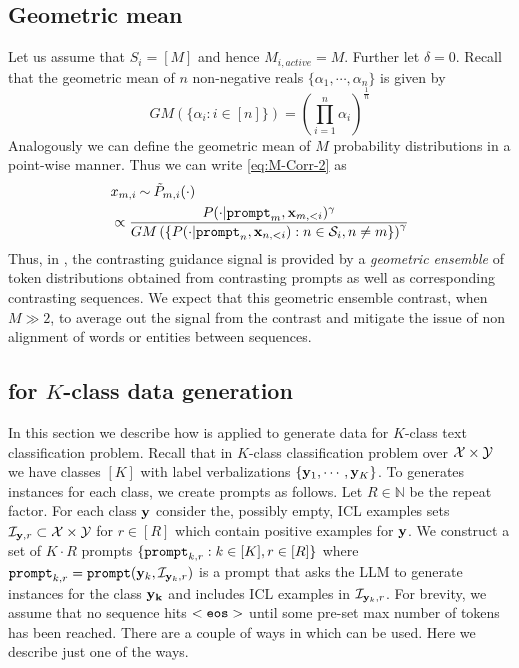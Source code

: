 \subsection{Geometric mean}
Let us assume that $S_i=[M]$ and hence $M_{i,active}=M$. Further let $\delta=0$. Recall that the geometric mean of $n$ non-negative reals $\{\alpha_1,\cdots,\alpha_n\}$ is given by
\begin{equation}
    GM(\{\alpha_i:i\in [n]\})=\left(\prod_{i=1}^n\alpha_i\right)^{\frac{1}{n}}
\end{equation}
Analogously we can define the geometric mean of $M$ probability distributions in a point-wise manner. Thus we can write \eqref{eq:M-Corr-2} as
\begin{align}
     &x_{m,i}\mathbin{\overset{}{\kern0pt\sim}}\tilde {P}_{m,i}(\cdot)\nonumber\\
    &\propto \frac{P(\cdot| \mathtt{prompt}_m,\mathbf{x}_{m,<i})^{\gamma}}{GM\left(\{P(\cdot| \mathtt{prompt}_n,\mathbf{x}_{n,<i}):n\in \mathcal{S}_i, n\neq m\}\right)^{\gamma}}\label{eq:M-Corr-3}
\end{align}
 Thus, in \corrsyn, the contrasting guidance signal is provided by a \textit{geometric ensemble} of token distributions obtained from contrasting prompts as well as corresponding contrasting sequences. We expect that this geometric ensemble contrast, when $M\gg 2$, to average out the signal from the contrast and mitigate the issue of non alignment of words or entities between sequences. 

 \subsection{\corrsyn{} for $K$-class data generation}
 \label{sec:K-corrsyn}
 In this section we describe how \corrsyn{} is applied to generate data for $K$-class text classification problem. Recall that in $K$-class classification problem over $\mathcal{X}\times\mathcal{Y}$ we have classes $[K]$ with label verbalizations $\{\mathbf{y}_1,\cdots,\mathbf{y}_K\}$. To generates instances for each class, we create prompts as follows. Let $R\in\mathbb{N}$ be the repeat factor. For each class $\mathbf{y}$ consider the, possibly empty, ICL examples sets $\mathcal{I}_{\mathbf{y},r}\subset \mathcal{X}\times\mathcal{Y}$ for $r\in [R]$ which contain positive examples for $\mathbf{y}$. We construct a set of $K\cdot R$ prompts $\{\mathtt{prompt}_{k,r}:k\in[K],r\in[R]\}$ where $\mathtt{prompt}_{k,r}=\mathtt{prompt}(\mathbf{y}_k,\mathcal{I}_{\mathbf{y}_k,r})$ is a prompt that asks the LLM to generate instances for the class ${\mathbf{y_k}}$ and includes ICL examples in $\mathcal{I}_{\mathbf{y}_k,r}$. For brevity, we assume that no sequence hits $\mathtt{<eos>}$ until some pre-set max number of tokens has been reached. There are a couple of ways in which \corrsyn{} can be used. Here we describe just one of the ways.%


